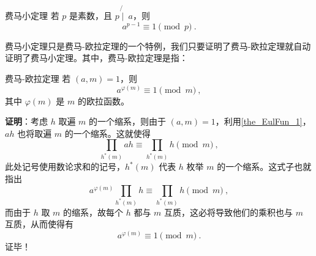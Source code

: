 

\begin{theorem}{费马小定理}
若 $p$ 是素数，且 $p \not{\mid}~ a$，则
\begin{equation}
a^{p-1} \equiv 1 \pmod p ~.
\end{equation}
\end{theorem}

费马小定理只是费马-欧拉定理的一个特例，我们只要证明了费马-欧拉定理就自动证明了费马小定理。其中，费马-欧拉定理是指：
\begin{theorem}{费马-欧拉定理}
若 $(a, m) = 1$，则
\begin{equation}
a^{\varphi(m)} \equiv 1 \pmod m ~,
\end{equation}
其中 $\varphi(m)$ 是 $m$ 的欧拉函数。
\end{theorem}
\textbf{证明}：考虑 $h$ 取遍 $m$ 的一个缩系，则由于 $(a, m) = 1$，利用\autoref{the_EulFun_1}，$ah$ 也将取遍 $m$ 的一个缩系。这就使得
\begin{equation}
\prod_{h^*(m)}{a h} \equiv \prod _{h^*(m)}h \pmod m ~,
\end{equation}
此处记号使用数论求和的记号，$h^*(m)$ 代表 $h$ 枚举 $m$ 的一个缩系。这式子也就指出
\begin{equation}
a^{\varphi(m)} \prod_{h^*(m)} h \equiv \prod_{h^*(m)} h \pmod m ~,
\end{equation}
而由于 $h$ 取 $m$ 的缩系，故每个 $h$ 都与 $m$ 互质，这必将导致他们的乘积也与 $m$ 互质，从而使得有
\begin{equation}
a^{\varphi(m)} \equiv 1 \pmod m ~.
\end{equation}
证毕！


